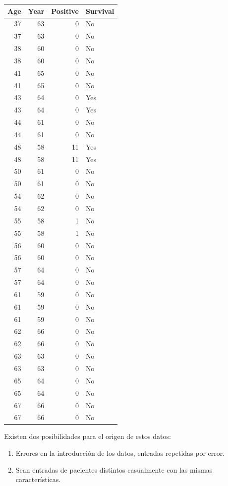 \begin{tabular}{r|r|r|l}
\hline
Age & Year & Positive & Survival\\
\hline
37 & 63 & 0 & No\\
\hline
37 & 63 & 0 & No\\
\hline
38 & 60 & 0 & No\\
\hline
38 & 60 & 0 & No\\
\hline
41 & 65 & 0 & No\\
\hline
41 & 65 & 0 & No\\
\hline
43 & 64 & 0 & Yes\\
\hline
43 & 64 & 0 & Yes\\
\hline
44 & 61 & 0 & No\\
\hline
44 & 61 & 0 & No\\
\hline
48 & 58 & 11 & Yes\\
\hline
48 & 58 & 11 & Yes\\
\hline
50 & 61 & 0 & No\\
\hline
50 & 61 & 0 & No\\
\hline
54 & 62 & 0 & No\\
\hline
54 & 62 & 0 & No\\
\hline
55 & 58 & 1 & No\\
\hline
55 & 58 & 1 & No\\
\hline
56 & 60 & 0 & No\\
\hline
56 & 60 & 0 & No\\
\hline
57 & 64 & 0 & No\\
\hline
57 & 64 & 0 & No\\
\hline
61 & 59 & 0 & No\\
\hline
61 & 59 & 0 & No\\
\hline
61 & 59 & 0 & No\\
\hline
62 & 66 & 0 & No\\
\hline
62 & 66 & 0 & No\\
\hline
63 & 63 & 0 & No\\
\hline
63 & 63 & 0 & No\\
\hline
65 & 64 & 0 & No\\
\hline
65 & 64 & 0 & No\\
\hline
67 & 66 & 0 & No\\
\hline
67 & 66 & 0 & No\\
\hline
\end{tabular}

Existen dos posibilidades para el origen de estos datos:

\begin{enumerate}
\def\labelenumi{\arabic{enumi}.}

\item
  Errores en la introducción de los datos, entradas repetidas por error.
\item
  Sean entradas de pacientes distintos casualmente con las mismas
  características.
\end{enumerate}

